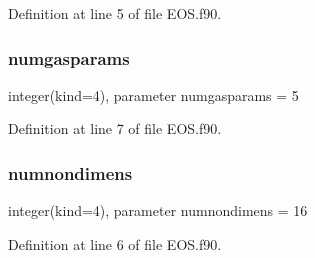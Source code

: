 Definition at line 5 of file E\+O\+S.\+f90.

\hypertarget{namespaceeos_ad25ac74c4fda2578144b6019873d260d}{}\label{namespaceeos_ad25ac74c4fda2578144b6019873d260d} 
\subsubsection{\texorpdfstring{numgasparams}{numgasparams}}
{\footnotesize\ttfamily integer(kind=4), parameter numgasparams = 5}



Definition at line 7 of file E\+O\+S.\+f90.

\hypertarget{namespaceeos_ad4f9e001c613d757ed00087617a0d158}{}\label{namespaceeos_ad4f9e001c613d757ed00087617a0d158} 
\subsubsection{\texorpdfstring{numnondimens}{numnondimens}}
{\footnotesize\ttfamily integer(kind=4), parameter numnondimens = 16}



Definition at line 6 of file E\+O\+S.\+f90.

